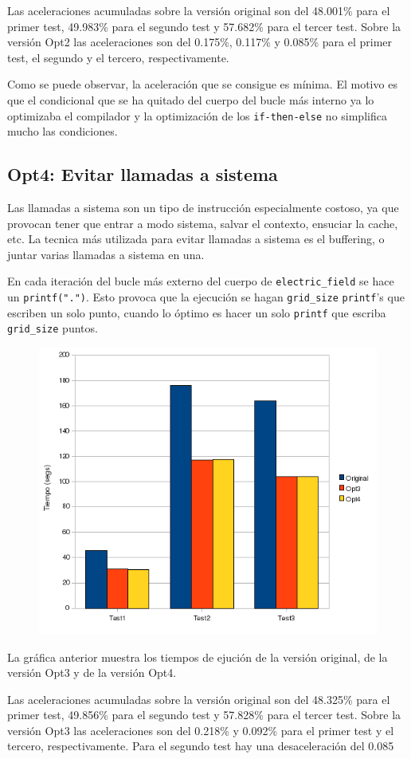 Las aceleraciones acumuladas sobre la versi\'{o}n original son del 48.001\% para el
primer test, 49.983\% para el segundo test y 57.682\% para el tercer test. Sobre
la versi\'{o}n Opt2 las aceleraciones son del 0.175\%, 0.117\% y 0.085\% para el
primer test, el segundo y el tercero, respectivamente.

Como se puede observar, la aceleraci\'{o}n que se consigue es m\'{i}nima. El
motivo es que el condicional que se ha quitado del cuerpo del bucle m\'{a}s
interno ya lo optimizaba el compilador y la optimizaci\'{o}n de los
\texttt{if-then-else} no simplifica mucho las condiciones.

\subsection{Opt4: Evitar llamadas a sistema}

Las llamadas a sistema son un tipo de instrucci\'{o}n especialmente costoso, ya
que provocan tener que entrar a modo sistema, salvar el contexto, ensuciar la
cache, etc. La tecnica m\'{a}s utilizada para evitar llamadas a sistema es el
buffering, o juntar varias llamadas a sistema en una.

En cada iteraci\'{o}n del bucle m\'{a}s externo del cuerpo de
\texttt{electric\_field} se hace un \texttt{printf(".")}. Esto provoca que
la ejecuci\'{o}n se hagan \texttt{grid\_size} \texttt{printf}'s que escriben un
solo punto, cuando lo \'{o}ptimo es hacer un solo \texttt{printf} que escriba
\texttt{grid\_size} puntos.

\begin{figure}[ht]
   \centering
   \includegraphics[keepaspectratio=true,width=.5\textwidth]{figures/opt4-perf}
\end{figure}

La gr\'{a}fica anterior muestra los tiempos de ejuci\'{o}n de la versi\'{o}n
original, de la versi\'{o}n Opt3 y de la versi\'{o}n Opt4.

Las aceleraciones acumuladas sobre la versi\'{o}n original son del 48.325\% para el
primer test, 49.856\% para el segundo test y 57.828\% para el tercer test. Sobre
la versi\'{o}n Opt3 las aceleraciones son del 0.218\% y 0.092\% para el primer
test y el tercero, respectivamente. Para el segundo test hay una
desaceleraci\'{o}n del 0.085%

